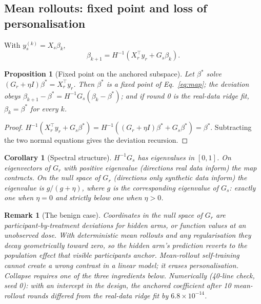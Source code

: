 \documentclass[11pt,a4paper]{article}
\newtheorem{proposition}{Proposition}[section]
\newtheorem{corollary}{Corollary}[section]
\newtheorem{remark}{Remark}[section]
\begin{document}
\subsection{Mean rollouts: fixed point and loss of personalisation}
With $y_s^{(k)}=X_s\beta_k$,
\begin{equation}\label{eq:map}
\beta_{k+1}=H^{-1}\left(X_r^\top y_r+G_s\beta_k\right).
\end{equation}
\begin{proposition}[Fixed point on the anchored subspace]
Let $\beta^*$ solve $(G_r+\eta I)\beta^*=X_r^\top y_r$. Then $\beta^*$ is a fixed point of Eq.~\ref{eq:map}; the deviation obeys $\beta_{k+1}-\beta^*=H^{-1}G_s(\beta_k-\beta^*)$; and if round 0 is the real-data ridge fit, $\beta_k=\beta^*$ for every $k$.
\end{proposition}
\begin{proof}
$H^{-1}(X_r^\top y_r+G_s\beta^*)=H^{-1}((G_r+\eta I)\beta^*+G_s\beta^*)=\beta^*$. Subtracting the two normal equations gives the deviation recursion.
\end{proof}
\begin{corollary}[Spectral structure]
$H^{-1}G_s$ has eigenvalues in $[0,1]$. On eigenvectors of $G_r$ with positive eigenvalue (directions real data inform) the map contracts. On the null space of $G_r$ (directions only synthetic data inform) the eigenvalue is $g/(g+\eta)$, where $g$ is the corresponding eigenvalue of $G_s$: exactly one when $\eta=0$ and strictly below one when $\eta>0$.
\end{corollary}
\begin{remark}[The benign case]
Coordinates in the null space of $G_r$ are participant-by-treatment deviations for hidden arms, or function values at an unobserved dose. With deterministic mean rollouts and any regularisation they decay geometrically toward zero, so the hidden arm's prediction reverts to the population effect that visible participants anchor. Mean-rollout self-training cannot create a wrong contrast in a linear model; it erases personalisation. Collapse requires one of the three ingredients below. Numerically (40-line check, seed 0): with an intercept in the design, the anchored coefficient after 10 mean-rollout rounds differed from the real-data ridge fit by $6.8\times10^{-14}$.
\end{remark}
\end{document}
